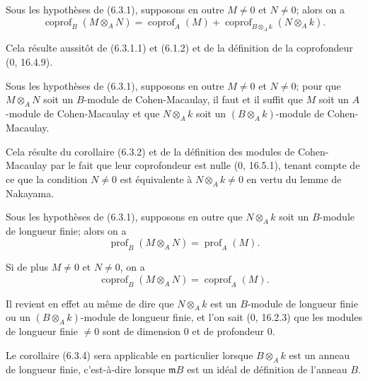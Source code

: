 \begin{corollary}[6.3.2]
\label{IV.2.s6.3.2-fr}
Sous les hypothèses de (6.3.1), supposons en outre $M\neq0$ et $N\neq0$;
alors on a
\begin{equation}
\operatorname{coprof}_B(M\otimes_AN)=\operatorname{coprof}_A(M)
+\operatorname{coprof}_{B\otimes_Ak}(N\otimes_Ak).
\tag{6.3.2.1}\label{IV.2.s6.3.2.1-fr}
\end{equation}
\end{corollary}

Cela résulte aussitôt de (6.3.1.1) et (6.1.2) et de la définition de la
coprofondeur (0, 16.4.9).

\begin{corollary}[6.3.3]
\label{IV.2.s6.3.3-fr}
Sous les hypothèses de (6.3.1), supposons en outre $M\neq0$ et $N\neq0$; pour
que $M\otimes_AN$ soit un $B$-module de Cohen-Macaulay, il faut et il suffit
que $M$ soit un $A$-module de Cohen-Macaulay et que $N\otimes_Ak$ soit un
$(B\otimes_Ak)$-module de Cohen-Macaulay.
\end{corollary}

Cela résulte du corollaire (6.3.2) et de la définition des modules de
Cohen-Macaulay par le fait que leur coprofondeur est nulle (0, 16.5.1), tenant
compte de ce que la condition $N\neq0$ est équivalente à $N\otimes_Ak\neq0$ en
vertu du lemme de Nakayama.

\begin{corollary}[6.3.4]
\label{IV.2.s6.3.4-fr}
Sous les hypothèses de (6.3.1), supposons en outre que $N\otimes_Ak$ soit un
$B$-module de longueur finie; alors on a
\begin{equation}
\operatorname{prof}_B(M\otimes_AN)=\operatorname{prof}_A(M).
\tag{6.3.4.1}\label{IV.2.s6.3.4.1-fr}
\end{equation}


Si de plus $M\neq0$ et $N\neq0$, on a
\begin{equation}
\operatorname{coprof}_B(M\otimes_AN)=\operatorname{coprof}_A(M).
\tag{6.3.4.2}\label{IV.2.s6.3.4.2-fr}
\end{equation}
\end{corollary}

Il revient en effet au même de dire que $N\otimes_Ak$ est un $B$-module de
longueur finie ou un $(B\otimes_Ak)$-module de longueur finie, et l'on sait
(0, 16.2.3) que les modules de longueur finie $\neq0$ sont de dimension $0$ et
de profondeur $0$.

Le corollaire (6.3.4) sera applicable en particulier lorsque $B\otimes_Ak$ est
un anneau de longueur finie, c'est-à-dire lorsque $\mathfrak mB$ est un idéal
de définition de l'anneau $B$.

